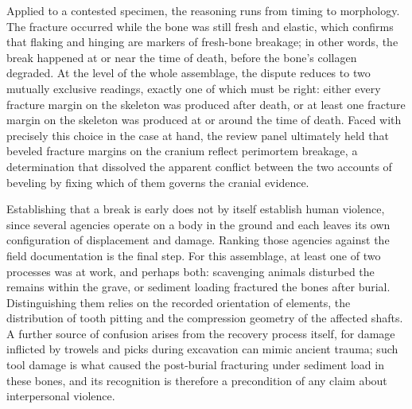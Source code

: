 \documentclass[11pt]{article}
\begin{document}
{Applied to a contested specimen, the reasoning runs from timing to morphology. The fracture occurred while the bone was still fresh and elastic, which confirms that flaking and hinging are markers of fresh-bone breakage; in other words, the break happened at or near the time of death, before the bone's collagen degraded. At the level of the whole assemblage, the dispute reduces to two mutually exclusive readings, exactly one of which must be right: either every fracture margin on the skeleton was produced after death, or at least one fracture margin on the skeleton was produced at or around the time of death. Faced with precisely this choice in the case at hand, the review panel ultimately held that beveled fracture margins on the cranium reflect perimortem breakage, a determination that dissolved the apparent conflict between the two accounts of beveling by fixing which of them governs the cranial evidence.

Establishing that a break is early does not by itself establish human violence, since several agencies operate on a body in the ground and each leaves its own configuration of displacement and damage. Ranking those agencies against the field documentation is the final step. For this assemblage, at least one of two processes was at work, and perhaps both: scavenging animals disturbed the remains within the grave, or sediment loading fractured the bones after burial. Distinguishing them relies on the recorded orientation of elements, the distribution of tooth pitting and the compression geometry of the affected shafts. A further source of confusion arises from the recovery process itself, for damage inflicted by trowels and picks during excavation can mimic ancient trauma; such tool damage is what caused the post-burial fracturing under sediment load in these bones, and its recognition is therefore a precondition of any claim about interpersonal violence.}
\end{document}
